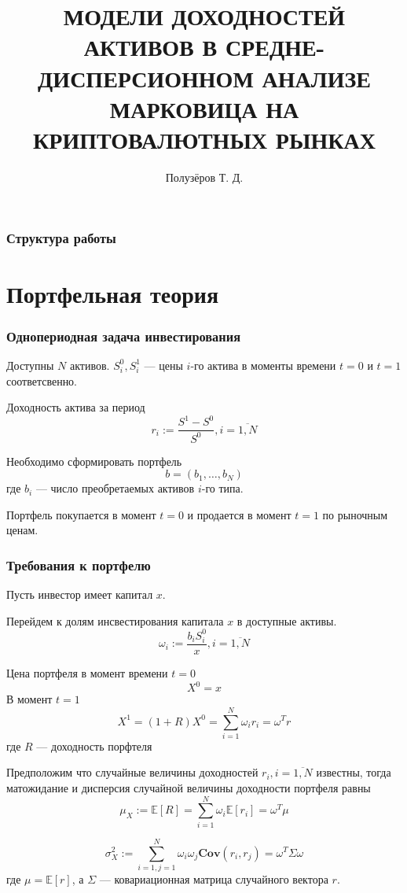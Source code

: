 \documentclass{beamer}
\title[]{МОДЕЛИ ДОХОДНОСТЕЙ АКТИВОВ В СРЕДНЕ-ДИСПЕРСИОННОМ АНАЛИЗЕ МАРКОВИЦА НА КРИПТОВАЛЮТНЫХ РЫНКАХ}
\subtitle{}
\author{Полузёров Т. Д.}
\institute{БГУ ФПМИ}
\date{}
\newcommand{\E}[1]{\mathbb{E}\left[#1\right]} %
\newcommand{\COV}[2]{\textbf{Cov}\left(#1, #2\right)}
\begin{document}
\begin{frame}
    \titlepage
\end{frame}

\begin{frame}
    \begin{center}
        \frametitle{Структура работы}
        \tableofcontents
    \end{center}
\end{frame}

\section{Портфельная теория}

\begin{frame}
    \frametitle{Однопериодная задача инвестирования}
    Доступны $N$ активов.
    $S_i^0, S_i^1$ --- цены $i$-го актива в моменты времени $t=0$ и
    $t=1$ соответсвенно.

    Доходность актива за период
    \[
        r_i := \frac{S^1 - S^0}{S^0}, i=\overline{1, N}
    \]

    Необходимо сформировать портфель
    \[
        b = (b_1, \dots, b_N)
    \]
    где $b_i$ --- число преобретаемых активов $i$-го типа.

    Портфель покупается в момент $t=0$ и продается в момент $t=1$ по рыночным ценам.
\end{frame}

\begin{frame}
    \frametitle{Требования к портфелю}
    Пусть инвестор имеет капитал $x$.

    Перейдем к долям инсвестирования капитала $x$ в доступные активы.
    \[
        \omega_i := \frac{b_i S_i^0}{x}, i=\overline{1, N}
    \]

    Цена портфеля в момент времени $t=0$
    \[
        X^0 = x
    \]
    В момент $t=1$
    \[
        X^1 = (1+R)X^0 = \sum_{i=1}^{N} \omega_i r_i = \omega^T r
    \]
    где $R$ --- доходность порфтеля
\end{frame}

\begin{frame}
    Предположим что случайные величины доходностей $r_i, i=\overline{1, N}$ известны, тогда
    матожидание и дисперсия случайной величины доходности портфеля равны
    \[
        \mu_X := \E{R} = \sum_{i=1}^{N} \omega_i \E{r_i} = \omega^T \mu
    \]

    \[
        \sigma_X^2 := \sum_{i=1, j=1}^{N} \omega_i \omega_j \COV{r_i}{r_j} =
        \omega^T \Sigma \omega
    \]
    где $\mu = \E{r}$, а $\Sigma$ --- ковариационная матрица случайного вектора $r$.
\end{frame}
\end{document}
